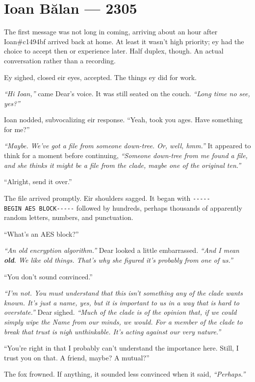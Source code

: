 \hypertarget{ioan-bux103lan-2305}{%
\chapter*{Ioan Bălan — 2305}\label{ioan-bux103lan-2305}}

The first message was not long in coming, arriving about an hour after Ioan\#c1494bf arrived back at home. At least it wasn't high priority; ey had the choice to accept then or experience later. Half duplex, though. An actual conversation rather than a recording.

Ey sighed, closed eir eyes, accepted. The things ey did for work.

\emph{``Hi Ioan,''} came Dear's voice. It was still seated on the couch. \emph{``Long time no see, yes?''}

Ioan nodded, subvocalizing eir response. ``Yeah, took you ages. Have something for me?''

\emph{``Maybe. We've got a file from someone down-tree. Or, well, hmm.''} It appeared to think for a moment before continuing, \emph{``Someone down-tree from me found a file, and she thinks it might be a file from the clade, maybe one of the original ten.''}

``Alright, send it over.''

The file arrived promptly. Eir shoulders sagged. It began with \texttt{-\/-\/-\/-\/-BEGIN\ AES\ BLOCK-\/-\/-\/-\/-} followed by hundreds, perhaps thousands of apparently random letters, numbers, and punctuation.

``What's an AES block?''

\emph{``An old encryption algorithm.''} Dear looked a little embarrassed. \emph{``And I mean \textbf{old}. We like old things. That's why she figured it's probably from one of us.''}

``You don't sound convinced.''

\emph{``I'm not. You must understand that this isn't something any of the clade wants known. It's just a name, yes, but it is important to us in a way that is hard to overstate.''} Dear sighed. \emph{``Much of the clade is of the opinion that, if we could simply wipe the Name from our minds, we would. For a member of the clade to break that trust is nigh unthinkable. It's acting against our very nature.''}

``You're right in that I probably can't understand the importance here. Still, I trust you on that. A friend, maybe? A mutual?''

The fox frowned. If anything, it sounded less convinced when it said, \emph{``Perhaps.''}

